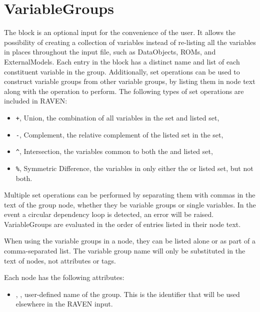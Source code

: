 \section{VariableGroups}
\label{sec:VariableGroups}

The  block is an optional input for the convenience of the user.  It allows the
possibility of creating a collection of variables instead of re-listing all the variables in places throughout
the input file, such as DataObjects, ROMs, and ExternalModels.
%
Each entry in the  block has a distinct name and list of each constituent variable in
the group.
%
Additionally, set operations can be used to construct variable groups from other variable groups, by listing
them in node text along with the operation to perform.
The following types of
set operations are included in RAVEN:
\begin{itemize}
  \item \texttt{+}, Union, the combination of all variables in the  set and listed set,
  \item \texttt{-}, Complement, the relative complement of the listed set in the  set,
  \item \texttt{\^}, Intersection, the variables common to both the  and listed set,
  \item \texttt{\%}, Symmetric Difference, the variables in only either the  or listed set,
    but not both.
\end{itemize}
Multiple set operations can be performed by separating them with commas in the text of the group node, whether
they be variable groups or single variables. In the event a circular dependency loop is detected, an error will be
raised. VariableGroups are evaluated in the order of entries listed in their node text.

When using the variable groups in a node, they can be listed alone or as part of a comma-separated list.  The
variable group name will only be substituted in the text of nodes, not attributes or tags.

Each  node has the following attributes:
\vspace{-5mm}
\begin{itemize}
  \itemsep0em
  \item {}, , user-defined name
  of the group. This is the identifier that will be used elsewhere in the RAVEN input.
\end{itemize}
\vspace{-5mm}

